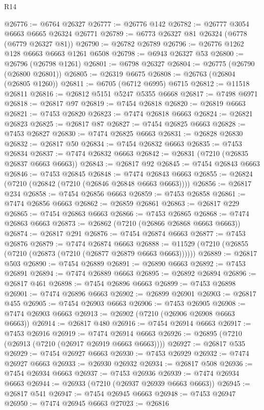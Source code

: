 \begin{lexlean}{R14}
\begin{coremodule}
{{{{{{{{{{{{{{{{{{{{{{{{{{{{{{{{{{{{{{{{{{{{{{{{{{{{{{{{{{{{{{{{{{{{{{{{{{{{{{{{{{@26776 := @6764 @26327
@26777 := @26776 @142
@26782 := @26777 @3054 @6663 @6665 @26324 @26771
@26789 := @6773 @26327 @81 @26324 (@6778 (@6779 @26327 @81))
@26790 := @26782 @26789
@26796 := @26776 @1262 @128 @6663 @6663 @1261 @6508
@26798 := @6943 @26327 @53
@26800 := @26796 (@26798 @1261)
@26801 := @6798 @26327
@26804 := @26775 (@26790 (@26800 @26801))
@26805 := @26319 @6675
@26808 := @26763 (@26804 (@26805 @1260))
@26811 := @6705 (@6712 @6995) @6715
@26812 := @11518 @26811
@26816 := @26812 @5151 @5247 @5355 @6668
@26817 := @7498 @6971
@26818 := @26817 @97
@26819 := @7454 @26818
@26820 := @26819 @6663
@26821 := @7453 @26820
@26823 := @7474 @26818 @6663
@26824 := @26821 @26823
@26825 := @26817 @87
@26827 := @7454 @26825 @6663
@26828 := @7453 @26827
@26830 := @7474 @26825 @6663
@26831 := @26828 @26830
@26832 := @26817 @50
@26834 := @7454 @26832 @6663
@26835 := @7453 @26834
@26837 := @7474 @26832 @6663
@26842 := @26831 (@7210 (@26835 @26837 @6663 @6663))
@26843 := @26817 @92
@26845 := @7454 @26843 @6663
@26846 := @7453 @26845
@26848 := @7474 @26843 @6663
@26855 := @26824 (@7210 (@26842 (@7210 (@26846 @26848 @6663 @6663))))
@26856 := @26817 @234
@26858 := @7454 @26856 @6663
@26859 := @7453 @26858
@26861 := @7474 @26856 @6663
@26862 := @26859 @26861
@26863 := @26817 @229
@26865 := @7454 @26863 @6663
@26866 := @7453 @26865
@26868 := @7474 @26863 @6663
@26873 := @26862 (@7210 (@26866 @26868 @6663 @6663))
@26874 := @26817 @291
@26876 := @7454 @26874 @6663
@26877 := @7453 @26876
@26879 := @7474 @26874 @6663
@26888 := @11529 (@7210 (@26855 (@7210 (@26873 (@7210 (@26877 @26879 @6663 @6663))))))
@26889 := @26817 @503
@26890 := @7454 @26889
@26891 := @26890 @6663
@26892 := @7453 @26891
@26894 := @7474 @26889 @6663
@26895 := @26892 @26894
@26896 := @26817 @461
@26898 := @7454 @26896 @6663
@26899 := @7453 @26898
@26901 := @7474 @26896 @6663
@26902 := @26899 @26901
@26903 := @26817 @455
@26905 := @7454 @26903 @6663
@26906 := @7453 @26905
@26908 := @7474 @26903 @6663
@26913 := @26902 (@7210 (@26906 @26908 @6663 @6663))
@26914 := @26817 @480
@26916 := @7454 @26914 @6663
@26917 := @7453 @26916
@26919 := @7474 @26914 @6663
@26926 := @26895 (@7210 (@26913 (@7210 (@26917 @26919 @6663 @6663))))
@26927 := @26817 @535
@26929 := @7454 @26927 @6663
@26930 := @7453 @26929
@26932 := @7474 @26927 @6663
@26933 := @26930 @26932
@26934 := @26817 @508
@26936 := @7454 @26934 @6663
@26937 := @7453 @26936
@26939 := @7474 @26934 @6663
@26944 := @26933 (@7210 (@26937 @26939 @6663 @6663))
@26945 := @26817 @541
@26947 := @7454 @26945 @6663
@26948 := @7453 @26947
@26950 := @7474 @26945 @6663
@27023 := @26816
}}}}}}}}}}}}}}}}}}}}}}}}}}}}}}}}}}}}}}}}}}}}}}}}}}}}}}}}}}}}}}}}}}}}}}}}}}}}}}}}}}
\end{coremodule}
\end{lexlean}
